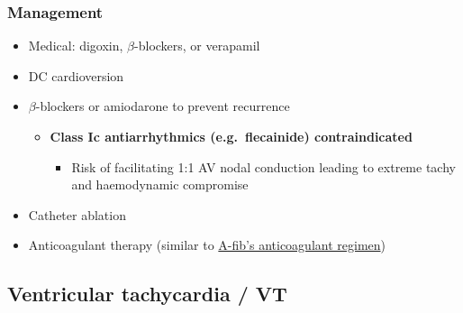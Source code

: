 \documentclass[
  12pt,
]{memoir}
\providecommand{\tightlist}{%
  \setlength{\itemsep}{0pt}\setlength{\parskip}{0pt}}
\begin{document}
\hypertarget{management-1}{%
\subsubsection{Management}\label{management-1}}

\begin{itemize}
\tightlist
\item
  Medical: digoxin, \(\beta\)-blockers, or verapamil
\item
  DC cardioversion
\item
  \(\beta\)-blockers or amiodarone to prevent recurrence

  \begin{itemize}
  \tightlist
  \item
    \textbf{Class Ic antiarrhythmics (e.g.~flecainide) contraindicated}

    \begin{itemize}
    \tightlist
    \item
      Risk of facilitating 1:1 AV nodal conduction leading to extreme
      tachy and haemodynamic compromise
    \end{itemize}
  \end{itemize}
\item
  Catheter ablation
\item
  Anticoagulant therapy (similar to
  \hyperref[item:anticoag]{A-fib's anticoagulant
   regimen})
\end{itemize}

\hypertarget{ventricular-tachycardia-vt}{%
\subsection{Ventricular tachycardia /
VT}\label{ventricular-tachycardia-vt}}
\end{document}
